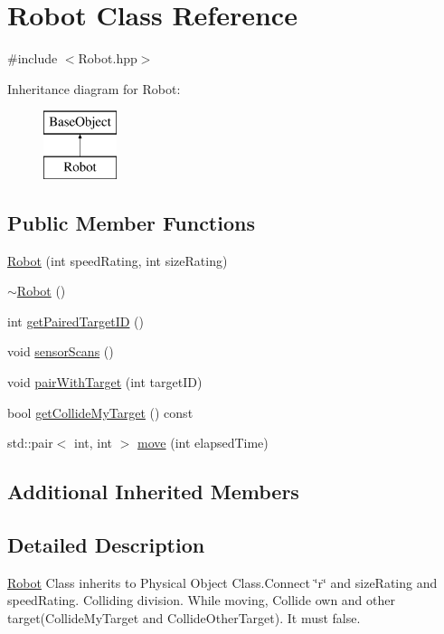 \hypertarget{classRobot}{\section{Robot Class Reference}
\label{classRobot}
}


{\ttfamily \#include $<$Robot.\-hpp$>$}

Inheritance diagram for Robot\-:\begin{figure}[H]
\begin{center}
\leavevmode
\includegraphics[height=2.000000cm]{classRobot}
\end{center}
\end{figure}
\subsection*{Public Member Functions}
\begin{DoxyCompactItemize}
\item 
\hyperlink{classRobot_afcba47fc04fbe6437521c282b9c5d80f}{Robot} (int speed\-Rating, int size\-Rating)
\item 
\hyperlink{classRobot_a924320124b09c2f2ac1621aa210d5f38}{$\sim$\-Robot} ()
\item 
int \hyperlink{classRobot_a8b7a0c6c281310ae1c4c0df08257599b}{get\-Paired\-Target\-I\-D} ()
\item 
void \hyperlink{classRobot_af594993f7484ac31a480617ac9957fed}{sensor\-Scans} ()
\item 
void \hyperlink{classRobot_ae170cc3e094fd3f82caedb2d7af54824}{pair\-With\-Target} (int target\-I\-D)
\item 
bool \hyperlink{classRobot_af3301a2536ba5bc5aefb7367ccbad6bd}{get\-Collide\-My\-Target} () const 
\item 
std\-::pair$<$ int, int $>$ \hyperlink{classRobot_a4372152d32fc8ccbf51133d9e5f6ad57}{move} (int elapsed\-Time)
\end{DoxyCompactItemize}
\subsection*{Additional Inherited Members}


\subsection{Detailed Description}
\hyperlink{classRobot}{Robot} Class inherits to Physical Object Class.\-Connect \char`\"{}r\char`\"{} and size\-Rating and speed\-Rating. Colliding division. While moving, Collide own and other target(\-Collide\-My\-Target and Collide\-Other\-Target). It must false. 

